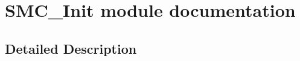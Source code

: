 \hypertarget{group___s_m_c___init__module}{}\section{S\+M\+C\+\_\+\+Init module documentation}
\label{group___s_m_c___init__module}


\subsection{Detailed Description}
